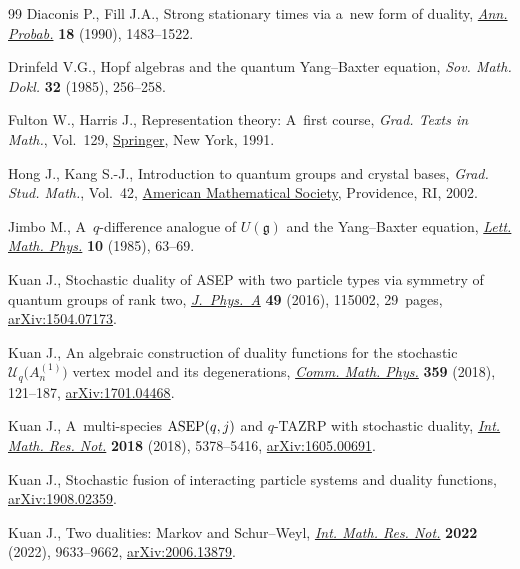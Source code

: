 \documentclass[pdftex]{sigma}
\numberwithin{equation}{section}
\theoremstyle{definition}
\begin{document}
\begin{thebibliography}{99}
Diaconis P., Fill J.A., Strong stationary times via a~new form of duality,
 \href{https://doi.org/10.1214/aop/1176990628}{\textit{Ann. Probab.}}
 \textbf{18} (1990), 1483--1522.

Drinfeld V.G., Hopf algebras and the quantum {Y}ang--{B}axter equation,
 \textit{Sov. Math. Dokl.} \textbf{32} (1985), 256--258.

Fulton W., Harris J., Representation theory: {A}~first course, \textit{Grad.
 Texts in Math.}, Vol.~129,
 \href{https://doi.org/10.1007/978-1-4612-0979-9}{Springer}, New York, 1991.

Hong J., Kang S.-J., Introduction to quantum groups and crystal bases,
 \textit{Grad. Stud. Math.}, Vol.~42,
 \href{https://doi.org/10.1090/gsm/042}{American Mathematical Society},
 Providence, RI, 2002.

Jimbo M., A~{$q$}-difference analogue of {$U({\mathfrak g})$} and the
 {Y}ang--{B}axter equation,
 \href{https://doi.org/10.1007/BF00704588}{\textit{Lett. Math. Phys.}}
 \textbf{10} (1985), 63--69.

Kuan J., Stochastic duality of {ASEP} with two particle types via symmetry of
 quantum groups of rank two,
 \href{https://doi.org/10.1088/1751-8113/49/11/115002}{\textit{J.~Phys.~A}}
 \textbf{49} (2016), 115002, 29~pages,
 \href{https://arxiv.org/abs/1504.07173}{arXiv:1504.07173}.

Kuan J., An algebraic construction of duality functions for the stochastic
 {$\mathcal{U}_q\bigl( A_n^{(1)}\bigr)$} vertex model and its degenerations,
 \href{https://doi.org/10.1007/s00220-018-3108-x}{\textit{Comm. Math. Phys.}}
 \textbf{359} (2018), 121--187,
 \href{https://arxiv.org/abs/1701.04468}{arXiv:1701.04468}.

Kuan J., A~multi-species {${\rm ASEP}(q,j)$} and {$q$}-{TAZRP} with stochastic
 duality, \href{https://doi.org/10.1093/imrn/rnx034}{\textit{Int. Math. Res.
 Not.}} \textbf{2018} (2018), 5378--5416,
 \href{https://arxiv.org/abs/1605.00691}{arXiv:1605.00691}.

Kuan J., Stochastic fusion of interacting particle systems and duality
 functions, \href{https://arxiv.org/abs/1908.02359}{arXiv:1908.02359}.

Kuan J., Two dualities: {M}arkov and {S}chur--{W}eyl,
 \href{https://doi.org/10.1093/imrn/rnaa333}{\textit{Int. Math. Res. Not.}}
 \textbf{2022} (2022), 9633--9662,
 \href{https://arxiv.org/abs/2006.13879}{arXiv:2006.13879}.


\end{thebibliography}
\end{document}

